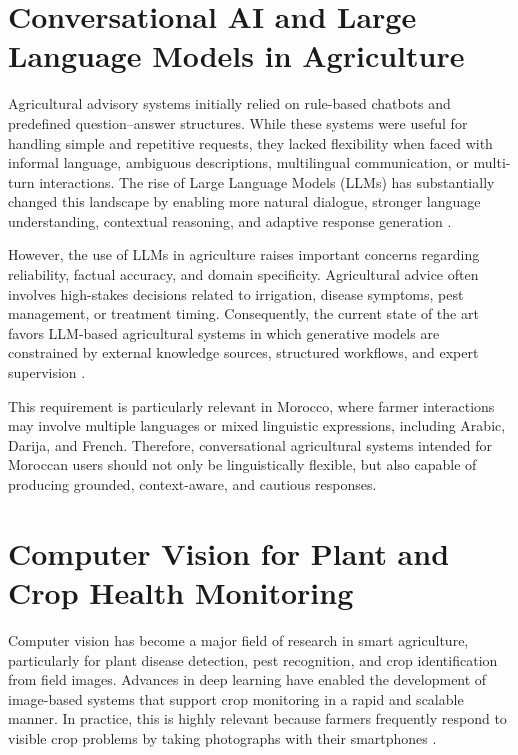 \section{Conversational AI and Large Language Models in Agriculture}

Agricultural advisory systems initially relied on rule-based chatbots and predefined question--answer structures. While these systems were useful for handling simple and repetitive requests, they lacked flexibility when faced with informal language, ambiguous descriptions, multilingual communication, or multi-turn interactions. The rise of Large Language Models (LLMs) has substantially changed this landscape by enabling more natural dialogue, stronger language understanding, contextual reasoning, and adaptive response generation \cite{li2025llm}.

However, the use of LLMs in agriculture raises important concerns regarding reliability, factual accuracy, and domain specificity. Agricultural advice often involves high-stakes decisions related to irrigation, disease symptoms, pest management, or treatment timing. Consequently, the current state of the art favors LLM-based agricultural systems in which generative models are constrained by external knowledge sources, structured workflows, and expert supervision \cite{li2025llm,yin2025foundation}.

This requirement is particularly relevant in Morocco, where farmer interactions may involve multiple languages or mixed linguistic expressions, including Arabic, Darija, and French. Therefore, conversational agricultural systems intended for Moroccan users should not only be linguistically flexible, but also capable of producing grounded, context-aware, and cautious responses.

\section{Computer Vision for Plant and Crop Health Monitoring}

Computer vision has become a major field of research in smart agriculture, particularly for plant disease detection, pest recognition, and crop identification from field images. Advances in deep learning have enabled the development of image-based systems that support crop monitoring in a rapid and scalable manner. In practice, this is highly relevant because farmers frequently respond to visible crop problems by taking photographs with their smartphones \cite{yin2025foundation,zhu2025vlm}.

